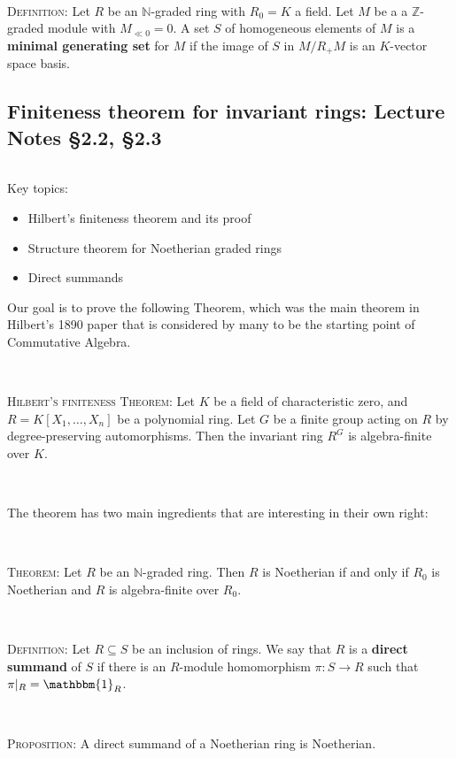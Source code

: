 \documentclass[12pt]{amsart}
\newcommand{\N}{\mathbb{N}}
\newcommand{\Z}{\mathbb{Z}}
\newcommand{\0}{$\phantom{.}$}
\newcommand{\1}{\mathbbm{1}}
\begin{document}
\

\noindent \textsc{Definition:} Let $R$ be an $\N$-graded ring with $R_0=K$ a field. Let $M$ be a a $\Z$-graded module with $M_{\ll 0}=0$. A set $S$ of homogeneous elements of $M$ is a \textbf{minimal generating set} for $M$ if the image of $S$ in $M/R_+ M$ is an $K$-vector space basis.


\newpage
\subsection{Finiteness theorem for invariant rings: Lecture Notes \S2.2, \S2.3} \0

\begin{framed} Key topics:
\begin{itemize}
\item Hilbert's finiteness theorem and its proof
\item Structure theorem for Noetherian graded rings
\item Direct summands
\end{itemize}
\end{framed}

\noindent Our goal is to prove the following Theorem, which was the main theorem in Hilbert's 1890 paper that is considered by many to be the starting point of Commutative Algebra.

\

\noindent \textsc{Hilbert's finiteness Theorem:} Let $K$ be a field of characteristic zero, and $R=K[X_1,\dots,X_n]$ be a polynomial ring. Let $G$ be a finite group acting on $R$ by degree-preserving automorphisms. Then the invariant ring $R^G$ is algebra-finite over $K$.

\

\noindent The theorem has two main ingredients that are interesting in their own right:

\

\noindent \textsc{Theorem:} Let $R$ be an $\N$-graded ring. Then $R$ is Noetherian if and only if $R_0$ is Noetherian and $R$ is algebra-finite over $R_0$.

\


\noindent \textsc{Definition:} Let $R\subseteq S$ be an inclusion of rings. We say that $R$ is a \textbf{direct summand} of $S$ if there is an $R$-module homomorphism $\pi:S\to R$ such that $\pi|_R=\1_R$.

\

\noindent \textsc{Proposition:} A direct summand of a Noetherian ring is Noetherian. 
\end{document}
